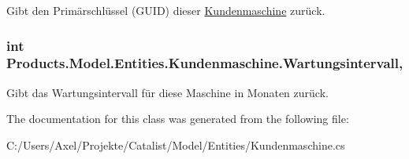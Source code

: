 Gibt den Primärschlüssel (G\+U\+ID) dieser \hyperlink{class_products_1_1_model_1_1_entities_1_1_kundenmaschine}{Kundenmaschine} zurück. 

\subsubsection[{\texorpdfstring{Wartungsintervall}{Wartungsintervall}}]{\setlength{\rightskip}{0pt plus 5cm}int Products.\+Model.\+Entities.\+Kundenmaschine.\+Wartungsintervall\hspace{0.3cm}{\ttfamily [get]}, {\ttfamily [set]}}\hypertarget{class_products_1_1_model_1_1_entities_1_1_kundenmaschine_a44f1b2970eba6205ed9447e3657c40cb}{}\label{class_products_1_1_model_1_1_entities_1_1_kundenmaschine_a44f1b2970eba6205ed9447e3657c40cb}


Gibt das Wartungsintervall für diese Maschine in Monaten zurück. 



The documentation for this class was generated from the following file\+:\begin{DoxyCompactItemize}
\item 
C\+:/\+Users/\+Axel/\+Projekte/\+Catalist/\+Model/\+Entities/Kundenmaschine.\+cs\end{DoxyCompactItemize}
